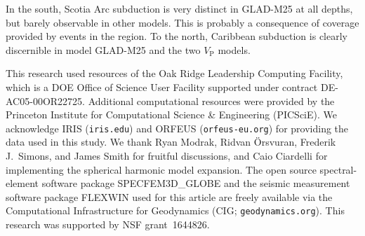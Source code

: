 \documentclass[extra,mreferee]{gji}
\begin{document}
In the south,
Scotia Arc subduction is very distinct in GLAD-M25 at all depths,
but barely observable in other models.
This is probably a consequence of coverage provided by events in the region.
To the north,
Caribbean subduction is clearly discernible in model GLAD-M25 and the two $V_\textrm{P}$ models.


\begin{acknowledgments}
This research used resources of the Oak Ridge Leadership Computing Facility,
which is a DOE Office of Science User Facility supported under contract DE-AC05-00OR22725.
Additional computational resources were provided by the Princeton Institute
for Computational Science \& Engineering (PICSciE).
We acknowledge IRIS ({\tt iris.edu}) and ORFEUS ({\tt orfeus-eu.org}) for
providing the data used in this study.
We thank Ryan Modrak, Ridvan \"{O}rsvuran, Frederik J.\ Simons, and James Smith for fruitful discussions,
and Caio Ciardelli for implementing the spherical harmonic model expansion.
The open source spectral-element software package SPECFEM3D\_GLOBE and
the seismic measurement software package FLEXWIN used for this article are
 freely available via the Computational Infrastructure for Geodynamics
 (CIG; {\tt geodynamics.org}).
 This research was supported by NSF grant~1644826.
\end{acknowledgments}

\newpage


\end{document}
